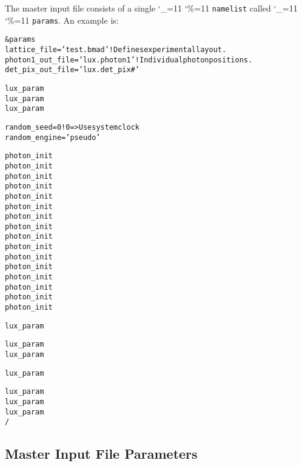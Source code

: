 \documentclass[11pt]{article}
\newcommand\ttcmd{\begingroup\catcode`\_=11 \catcode`\%=11 \dottcmd}
\newcommand\dottcmd[1]{\texttt{#1}\endgroup}
\newcommand{\vn}{\ttcmd}
\newenvironment{example}
  {\vspace{\ExBeg} \begin{alltt}}
  {\end{alltt} \vspace{\ExEnd}}
\newlength{\ExBeg}
\newlength{\ExEnd}
\begin{document}
The master input file consists of a single \vn{namelist} called \vn{params}.
An example is:
\begin{example}
  &params
    lattice_file = 'test.bmad'                     ! Defines experimental layout.
    photon1_out_file = 'lux.photon1'               ! Individual photon positions.
    det_pix_out_file = 'lux.det_pix#'

    lux_param%
    lux_param%
    lux_param%

    random_seed = 0                                ! 0 => Use system clock
    random_engine = 'pseudo'

    photon_init%
    photon_init%
    photon_init%
    photon_init%
    photon_init%
    photon_init%
    photon_init%
    photon_init%
    photon_init%
    photon_init%
    photon_init%
    photon_init%
    photon_init%
    photon_init%
    photon_init%
    photon_init%

    lux_param%

    lux_param%
    lux_param%

    lux_param%

    lux_param%
    lux_param%
    lux_param%
  /
\end{example}

\subsection{Master Input File Parameters}
\label{ss:master.params}
\end{document}
